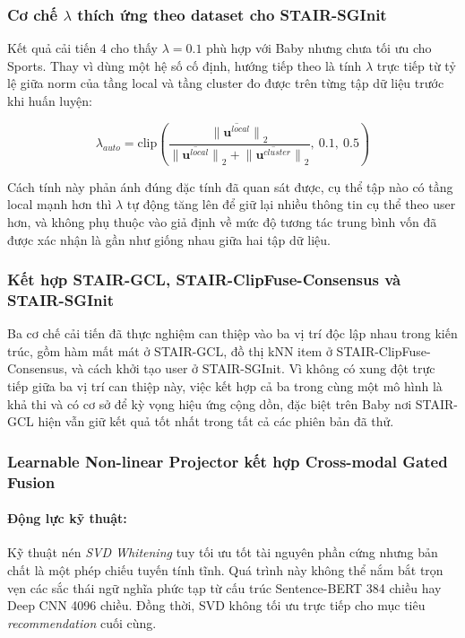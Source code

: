\begin{longtable}
\subsubsection{Cơ chế $\lambda$ thích ứng theo dataset cho STAIR-SGInit}
 
Kết quả cải tiến 4 cho thấy $\lambda = 0.1$ phù hợp với Baby nhưng chưa tối ưu cho Sports. Thay vì dùng một hệ số cố định, hướng tiếp theo là tính $\lambda$ trực tiếp từ tỷ lệ giữa norm của tầng local và tầng cluster đo được trên từng tập dữ liệu trước khi huấn luyện:
 
\begin{equation}
\lambda_{auto} = \text{clip}\left(\frac{\overline{\|\mathbf{u}^{local}\|}_2}{\overline{\|\mathbf{u}^{local}\|}_2 + \overline{\|\mathbf{u}^{cluster}\|}_2},\ 0.1,\ 0.5\right)
\end{equation}
 
Cách tính này phản ánh đúng đặc tính đã quan sát được, cụ thể tập nào có tầng local mạnh hơn thì $\lambda$ tự động tăng lên để giữ lại nhiều thông tin cụ thể theo user hơn, và không phụ thuộc vào giả định về mức độ tương tác trung bình vốn đã được xác nhận là gần như giống nhau giữa hai tập dữ liệu.
 
\subsubsection{Kết hợp STAIR-GCL, STAIR-ClipFuse-Consensus và STAIR-SGInit}
 
Ba cơ chế cải tiến đã thực nghiệm can thiệp vào ba vị trí độc lập nhau trong kiến trúc, gồm hàm mất mát ở STAIR-GCL, đồ thị kNN item ở STAIR-ClipFuse-Consensus, và cách khởi tạo user ở STAIR-SGInit. Vì không có xung đột trực tiếp giữa ba vị trí can thiệp này, việc kết hợp cả ba trong cùng một mô hình là khả thi và có cơ sở để kỳ vọng hiệu ứng cộng dồn, đặc biệt trên Baby nơi STAIR-GCL hiện vẫn giữ kết quả tốt nhất trong tất cả các phiên bản đã thử.
 
\subsubsection{Learnable Non-linear Projector kết hợp Cross-modal Gated Fusion}
 
\paragraph{Động lực kỹ thuật:}
Kỹ thuật nén \textit{SVD Whitening} tuy tối ưu tốt tài nguyên phần cứng nhưng bản chất là một phép chiếu tuyến tính tĩnh. Quá trình này không thể nắm bắt trọn vẹn các sắc thái ngữ nghĩa phức tạp từ cấu trúc Sentence-BERT 384 chiều hay Deep CNN 4096 chiều. Đồng thời, SVD không tối ưu trực tiếp cho mục tiêu \textit{recommendation} cuối cùng.
 

\end{longtable}
